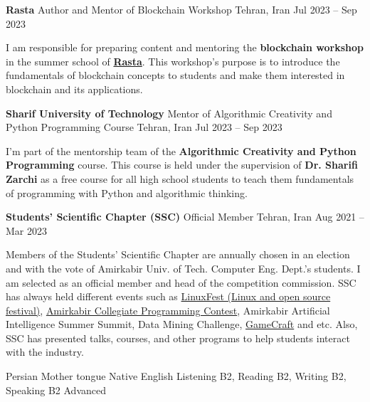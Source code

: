 \documentclass[]{awesome-cv}
\begin{document}
\vspace{2mm}
\begin{cventries}
	\cventry
	{\textbf{Rasta}}
	{Author and Mentor of Blockchain Workshop}
	{Tehran, Iran}
	{Jul 2023 – Sep 2023}
	{\begin{cvitems}
		\vspace{1mm}
		\item[] {I am responsible for preparing content and mentoring the \textbf{blockchain workshop} in the summer school of \href{https://rastaiha.ir/}{\textcolor{awesome}{\textbf{Rasta}}}. This workshop's purpose is to introduce the fundamentals of blockchain concepts to students and make them interested in blockchain and its applications.}
	\end{cvitems}}
	\cventry
	{\textbf{Sharif University of Technology}}
	{Mentor of Algorithmic Creativity and Python Programming Course}
	{Tehran, Iran}
	{Jul 2023 – Sep 2023}
	{\begin{cvitems}
		\vspace{1mm}
		\item[] {I'm part of the mentorship team of the \textbf{Algorithmic Creativity and Python Programming} course. This course is held under the supervision of \textbf{Dr. Sharifi Zarchi} as a free course for all high school students to teach them fundamentals of programming with Python and algorithmic thinking.}
	\end{cvitems}}
	\cventry
	{\textbf{Students'​ Scientific Chapter (SSC)}}
	{Official Member}
	{Tehran, Iran}
	{Aug 2021 – Mar 2023}
	{\begin{cvitems}
		\vspace{1mm}
		\item[] {Members of the Students' Scientific Chapter are annually chosen in an election and with the vote of Amirkabir Univ. of Tech. Computer Eng. Dept.'s students.
	I am selected as an official member and head of the competition commission.
	SSC has always held different events such as \href{http://linuxfest.aut.ac.ir/}{\textcolor{awesome}{LinuxFest (Linux and open source festival)}}, \href{https://icpc.aut.ac.ir/}{\textcolor{awesome}{Amirkabir
	Collegiate Programming Contest}}, Amirkabir Artificial Intelligence Summer Summit, Data Mining Challenge, \href{https://gamecraft.ce.aut.ac.ir/}{\textcolor{awesome}{GameCraft}} and etc.
	Also, SSC has presented talks, courses, and other programs to help students interact with the industry.}
	\end{cvitems}}
\end{cventries}
\begin{cvhonors}
	\cvhonor
	{Persian}
	{Mother tongue}
	{}
	{Native}
	\cvhonor
	{English}
	{Listening B2, Reading B2, Writing B2, Speaking B2}
	{}
	{Advanced}
\end{cvhonors}
\ 
\end{document}
